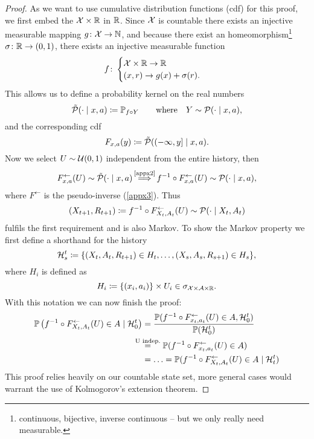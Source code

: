 \begin{proof}
	As we want to use cumulative distribution functions (cdf) for this proof, we first embed the \(\mathcal{X}\times\mathbb{R}\) in \(\mathbb{R}\). Since \(\mathcal{X}\) is countable there exists an injective measurable mapping \(g\colon \mathcal{X}\to\mathbb{N}\),
	and because there exist an homeomorphism\footnote{continuous, bijective, inverse continuous -- but we only really need measurable.} \(\sigma\colon \mathbb{R}\to(0,1)\), there exists an injective measurable function
	\begin{align*}
		f\colon
		\begin{cases}
			\mathcal{X}\times\mathbb{R} \to \mathbb{R} \\
			(x,r)\to g(x)+\sigma(r).
		\end{cases}
	\end{align*}
	This allows us to define a probability kernel on the real numbers
	\[
		\tilde{\mathcal{P}}(\cdot\mid x,a)\coloneqq \mathbb{P}_{f\circ Y} \qquad 
		\text{where}\quad Y\sim \mathcal{P}(\cdot\mid x,a),
	\] and the corresponding cdf
	\[
		F_{x,a}(y)\coloneqq \tilde{\mathcal{P}}( (-\infty,y]\mid x,a).
	\]
	Now we select \(U\sim \mathcal{U}(0,1)\) independent from the entire history, then 
	\begin{align*}
		F^\leftarrow_{x,a}(U) \sim \tilde{\cP}(\cdot\mid x,a) 
		\ximplies{\text{\ref{appx2}}} f^{-1}\circ F^\leftarrow_{x,a}(U)\sim \cP(\cdot \mid x,a),
	\end{align*}
	where \(F^\leftarrow\) is the pseudo-inverse (\ref{appx3}).	Thus 
	\[
		(X_{t+1},R_{t+1})\coloneqq f^{-1}\circ 
		F^\leftarrow_{X_t, A_t}(U) \sim \mathcal{P}(\cdot \mid X_t, A_t)
	\]
	fulfils the first requirement and is also Markov. To show the Markov property we first define a shorthand for the history
	\[
		\mathcal{H}_s^t\coloneqq \{(X_t,A_t,R_{t+1})\in H_t,\dots,(X_s,A_s,R_{s+1})\in H_s \},
	\]
	where \(H_i\) is defined as
	\[
		H_i\coloneqq\{(x_i,a_i)\}\times U_i \in \sigma_{\mathcal{X}\times\mathcal{A}\times\mathbb{R}}.
	\]
	With this notation we can now finish the proof:
	\begin{align*}
		\Pr\left(f^{-1}\circ F^\leftarrow_{X_t, A_t}(U) \in A \mid \cH_0^t\right)
		&=\frac{\Pr(f^{-1}\circ F^\leftarrow_{x_t, a_t}(U) \in A, \cH_0^t)}{
			\Pr(\cH_0^t)}\\
		&\lxeq{\text{U indep.}}\Pr(f^{-1}\circ F^\leftarrow_{x_t, a_t}(U) \in A)\\
		&=\dotsc = \Pr(f^{-1}\circ F^\leftarrow_{X_t, A_t}(U) \in A \mid \cH_t^t)
	\end{align*}
	This proof relies heavily on our countable state set, more general cases would warrant the use of Kolmogorov's extension theorem. 
\end{proof}

